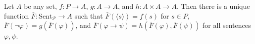 Let $A$ be any set, $f: P \to A$, $g: A \to A$, and $h: A \times A \to A$. Then there is a unique function $\overline{F}: \text{Sent}_{\mathcal{P}} \to A$ such that $\overline{F}(\langle s \rangle) = f(s)$ for $s \in P$, $\overline{F}(\neg \varphi) = g(\overline{F}(\varphi))$, and $\overline{F}(\varphi \rightarrow \psi) = h(\overline{F}(\varphi), \overline{F}(\psi))$ for all sentences $\varphi, \psi$.